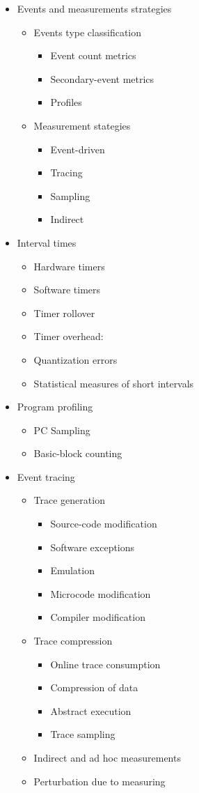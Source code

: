 \documentclass[openany, a4paper]{book}
\theoremstyle{break}
\theoremstyle{example}
\theoremstyle{note}
\theoremstyle{break}
\theoremstyle{exercise}
\begin{document}
\begin{itemize}
\item Events and measurements strategies
\begin{itemize}
\item Events type classification
\begin{itemize}
\item Event count metrics
\item Secondary-event metrics
\item Profiles
\end{itemize}
\item Measurement stategies
\begin{itemize}
\item Event-driven
\item Tracing
\item Sampling
\item Indirect
\end{itemize}
\end{itemize}
\item Interval times
\begin{itemize}
\item Hardware timers
\item Software timers
\item Timer rollover
\item Timer overhead:
\item Quantization errors
\item Statistical measures of short intervals
\end{itemize}
\item Program profiling
\begin{itemize}
\item PC Sampling
\item Basic-block counting
\end{itemize}
\item Event tracing
\begin{itemize}
\item Trace generation
\begin{itemize}
\item Source-code modification
\item Software exceptions
\item Emulation
\item Microcode modification
\item Compiler modification
\end{itemize}
\item Trace compression
\begin{itemize}
\item Online trace consumption
\item Compression of data
\item Abstract execution
\item Trace sampling
\end{itemize}
\item Indirect and ad hoc measurements
\item Perturbation due to measuring
\end{itemize}
\end{itemize}
\end{document}
